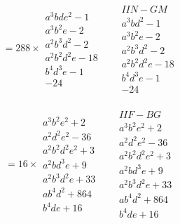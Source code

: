 \documentclass[11pt,a4paper]{article}
\theoremstyle{definition}
\begin{document}
\begin{align*}
= 288 \times
\begin{array}{l}
a^{3}bde^{2} - 1\\
a^{3}b^{2}e - 2\\
a^{2}b^{3}d^{2} - 2\\
a^{2}b^{2}d^{2}e - 18\\
b^{4}d^{3}e - 1\\
-24
\end{array}
&&
\begin{array}{l}
IIN - GM\\
a^{3}bd^{2} - 1\\
a^{3}b^{2}e - 2\\
a^{2}b^{3}d^{2} - 2\\
a^{2}b^{2}d^{2}e - 18\\
b^{4}d^{3}e - 1\\
-24
\end{array}
\end{align*}

\begin{align*}
= 16 \times
\begin{array}{l}
a^{3}b^{2}e^{2} + 2\\
a^{2}d^{2}e^{2} - 36\\
a^{2}b^{2}d^{2}e^{2} + 3\\
a^{2}bd^{3}e + 9\\
a^{2}b^{3}d^{2}e + 33\\
ab^{4}d^{2} + 864\\
b^{4}de + 16
\end{array}
&&
\begin{array}{l}
IIF - BG\\
a^{3}b^{2}e^{2} + 2\\
a^{2}d^{2}e^{2} - 36\\
a^{2}b^{2}d^{2}e^{2} + 3\\
a^{2}bd^{3}e + 9\\
a^{2}b^{3}d^{2}e + 33\\
ab^{4}d^{2} + 864\\
b^{4}de + 16
\end{array}
\end{align*}
\end{document}
